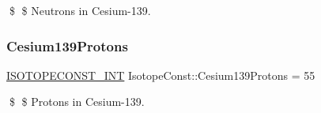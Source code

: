 \$ \$ Neutrons in Cesium-\/139. \mbox{\label{group___isotope_const-_cesium-_cs139_ga9480cb46436ad0ba8a9dd16c8453daec}} 
\subsubsection{\texorpdfstring{Cesium139\+Protons}{Cesium139Protons}}
{\footnotesize\ttfamily \mbox{\hyperlink{group___isotope_const-_macros_ga5f18360b3e99483a35c32d789e62621c}{I\+S\+O\+T\+O\+P\+E\+C\+O\+N\+S\+T\+\_\+\+I\+NT}} Isotope\+Const\+::\+Cesium139\+Protons = 55}

\$ \$ Protons in Cesium-\/139. 